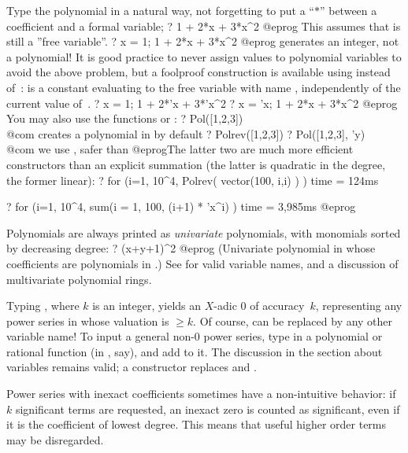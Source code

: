 %
\label{se:pol}
Type the polynomial in a natural way, not forgetting to put a ``$*$'' between
a coefficient and a formal variable;
\bprog
? 1 + 2*x + 3*x^2
@eprog\noindent
This assumes that  is still a ''free variable''.
\bprog
? x = 1; 1 + 2*x + 3*x^2
@eprog\noindent
generates an integer, not a polynomial! It is good practice to never assign
values to polynomial variables to avoid the above problem, but a foolproof
construction is available using  instead of~: 
is a constant evaluating to the free variable with name ,
independently of the current value of~.
\bprog
? x = 1; 1 + 2*'x + 3*'x^2
? x = 'x; 1 + 2*x + 3*x^2
@eprog\noindent
You may also use the functions  or :
\bprog
? Pol([1,2,3])       \\@com {} creates a polynomial in  by default
? Polrev([1,2,3])
? Pol([1,2,3], 'y)   \\@com we use , safer than 
@eprog\noindent The latter two are much more efficient constructors than an
explicit summation (the latter is quadratic in the degree, the former linear):
\bprog
? for (i=1, 10^4, Polrev( vector(100, i,i) ) )
time = 124ms

? for (i=1, 10^4, sum(i = 1, 100, (i+1) * 'x^i) )
time = 3,985ms
@eprog

Polynomials are always printed as \emph{univariate} polynomials, with
monomials sorted by decreasing degree:
\bprog
? (x+y+1)^2
@eprog\noindent
(Univariate polynomial in  whose coefficients are polynomials in
.) See  for valid variable names, and a discussion
of multivariate polynomial rings.

%
\label{se:series}
Typing , where $k$ is an integer, yields an $X$-adic $0$ of
accuracy~$k$, representing any power series in  whose valuation is
$\geq k$. Of course,  can be replaced by any other variable name! To
input a general non-0 power series, type in a polynomial or rational
function (in , say), and add  to it. The discussion
in the  section about variables remains valid; a constructor
 replaces  and .

 Power series with inexact coefficients sometimes have a
non-intuitive behavior: if $k$ significant terms are requested, an inexact
zero is counted as significant, even if it is the coefficient of lowest
degree. This means that useful higher order terms may be disregarded.

